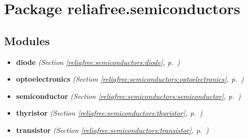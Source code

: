 %
%
%


\section{Package reliafree.semiconductors}

    \label{reliafree:semiconductors}


\subsection{Modules}

\begin{itemize}
\setlength{\parskip}{0ex}
\item \textbf{diode}
  \textit{(Section \ref{reliafree:semiconductors:diode}, p.~\pageref{reliafree:semiconductors:diode})}

\item \textbf{optoelectronics}
  \textit{(Section \ref{reliafree:semiconductors:optoelectronics}, p.~\pageref{reliafree:semiconductors:optoelectronics})}

\item \textbf{semiconductor}
  \textit{(Section \ref{reliafree:semiconductors:semiconductor}, p.~\pageref{reliafree:semiconductors:semiconductor})}

\item \textbf{thyristor}
  \textit{(Section \ref{reliafree:semiconductors:thyristor}, p.~\pageref{reliafree:semiconductors:thyristor})}

\item \textbf{transistor}
  \textit{(Section \ref{reliafree:semiconductors:transistor}, p.~\pageref{reliafree:semiconductors:transistor})}

\end{itemize}


